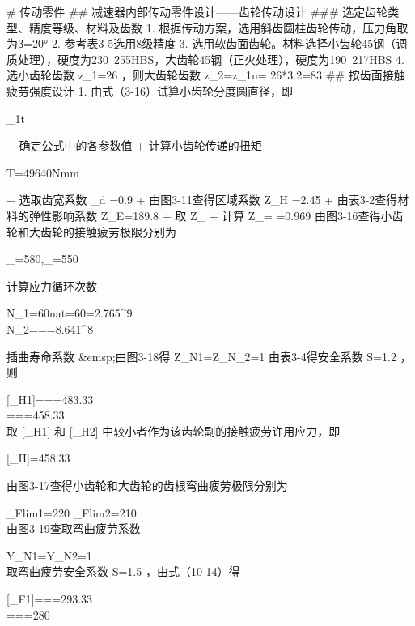 \documentclass{article}
\begin{document}
# 传动零件
## 减速器内部传动零件设计——齿轮传动设计
### 选定齿轮类型、精度等级、材料及齿数
1. 根据传动方案，选用斜齿圆柱齿轮传动，压力角取为β=20°
2. 参考表3-5选用8级精度
3. 选用软齿面齿轮。材料选择小齿轮45钢（调质处理），硬度为230~255HBS，大齿轮45钢（正火处理），硬度为190~217HBS
4. 选小齿轮齿数 z_1=26 ，则大齿轮齿数 z_2=z_1\times u= 26*3.2=83 
## 按齿面接触疲劳强度设计
1. 由式（3-16）试算小齿轮分度圆直径，即

_{1t}\geq {}

+ 确定公式中的各参数值
+  计算小齿轮传递的扭矩

T=49640N\cdot mm

+ 选取齿宽系数 \Phi_d =0.9
+ 由图3-11查得区域系数 Z_H =2.45
+ 由表3-2查得材料的弹性影响系数 Z_E=189.8  
+ 取 Z_
+ 计算 Z_\beta=\sqrt{\cos\beta} =0.969  
由图3-16查得小齿轮和大齿轮的接触疲劳极限分别为

\sigma_{}=580,\sigma_{}=550

计算应力循环次数

N_1=60nat=60=2.765^9\\
N_2===8.641^8

插曲寿命系数  
&emsp;由图3-18得 Z_{N1}=Z_{N_2}=1   
由表3-4得安全系数 S=1.2 ，则

[\sigma_{H1}]===483.33\\
[\sigma_{H2}]===458.33\\

取 [\sigma_{H1}] 和 [\sigma_{H2}] 中较小者作为该齿轮副的接触疲劳许用应力，即

[\sigma_{H}]=458.33

由图3-17查得小齿轮和大齿轮的齿根弯曲疲劳极限分别为

\sigma_{Flim1}=220\qquad
\sigma_{Flim2}=210\\

由图3-19查取弯曲疲劳系数

Y_{N1}=Y_{N2}=1\\

取弯曲疲劳安全系数 S=1.5 ，由式（10-14）得

[\sigma_{F1}]===293.33\\
[\sigma_{F2}]===280\\
\end{document}
